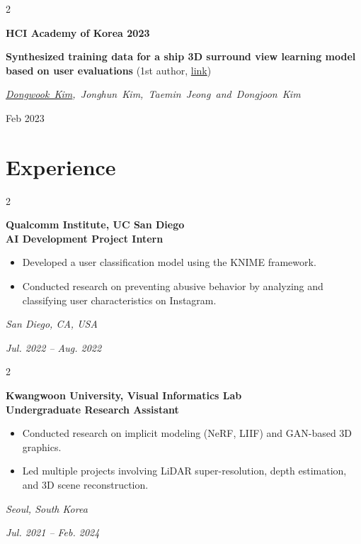 \documentclass[10pt, letterpaper]{article}
\newenvironment{highlights}{
    \begin{itemize}[
        topsep=0.10 cm,
        parsep=0.10 cm,
        partopsep=0pt,
        itemsep=0pt,
        leftmargin=0.4 cm + 10pt
    ]
}{
    \end{itemize}
} %
\newenvironment{twocolentry}[2][]{
    \onecolentry
    \def\secondColumn{#2}
    \setcolumnwidth{\fill, 3.5 cm}
    \begin{paracol}{2}
}{
    \switchcolumn \raggedleft \secondColumn
    \end{paracol}
    \endonecolentry
} %
\let\hrefWithoutArrow\href
\renewcommand{\href}[2]{\hrefWithoutArrow{#1}{\ifthenelse{\equal{#2}{}}{ }{#2 }\raisebox{.15ex}{\footnotesize \faExternalLink*}}}
\begin{document}
        \begin{twocolentry}{
            Feb 2023
        }
            \textbf{\color{headingOrange}HCI Academy of Korea 2023}

            \textbf{Synthesized training data for a ship 3D surround view learning model based on user evaluations}
            (1st author, \hrefWithoutArrow{https://www.dbpia.co.kr/pdf/pdfView.do?nodeId=NODE11229776&width=1732}{\faLink link}) 
 
            \mbox{\textit{\underline{Dongwook Kim}, Jonghun Kim, Taemin Jeong and Dongjoon Kim}}
            
        
            \vspace{0.10 cm}
            
        \end{twocolentry}



        

            
    \section{Experience}

    \begin{twocolentry}{
        \small\textit{San Diego, CA, USA}
        
        \vspace{0.2cm}
        
        \textit{Jul. 2022 – Aug. 2022}
    }
        \textbf{\color{headingOrange}Qualcomm Institute, UC San Diego} \\
        \textbf{AI Development Project Intern}
        \begin{highlights}
            \item Developed a user classification model using the KNIME framework.
            \item Conducted research on preventing abusive behavior by analyzing and classifying user characteristics on Instagram.
        \end{highlights}
    \end{twocolentry}

    \begin{twocolentry}{
        \small\textit{Seoul, South Korea} 

        \textit{Jul. 2021 – Feb. 2024}
    }
        \textbf{\color{headingOrange}Kwangwoon University, Visual Informatics Lab} \\
        \textbf{Undergraduate Research Assistant}
        \begin{highlights}
            \item Conducted research on implicit modeling (NeRF, LIIF) and GAN-based 3D graphics.
            \item Led multiple projects involving LiDAR super-resolution, depth estimation, and 3D scene reconstruction.
        \end{highlights}
    \end{twocolentry}
\end{document}
